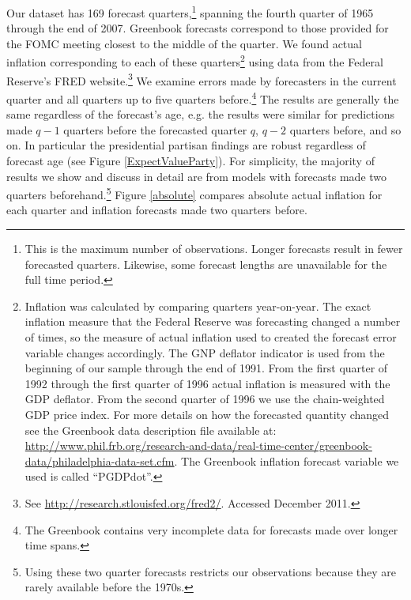 \documentclass[a4paper]{article}\usepackage[]{graphicx}\usepackage[]{color}
\begin{document}
Our dataset has 169 forecast quarters,\footnote{This is the maximum number of observations. Longer forecasts result in fewer forecasted quarters. Likewise, some forecast lengths are unavailable for the full time period.} spanning the fourth quarter of 1965 through the end of 2007. Greenbook forecasts correspond to those provided for the FOMC meeting closest to the middle of the quarter. We found actual inflation corresponding to each of these quarters\footnote{Inflation was calculated by comparing quarters year-on-year. The exact inflation measure that the Federal Reserve was forecasting changed a number of times, so the measure of actual inflation used to created the forecast error variable changes accordingly. The GNP deflator indicator is used from the beginning of our sample through the end of 1991. From the first quarter of 1992 through the first quarter of 1996 actual inflation is measured with the GDP deflator. From the second quarter of 1996 we use the chain-weighted GDP price index. For more details on how the forecasted quantity changed see the Greenbook data description file available at: \url{http://www.phil.frb.org/research-and-data/real-time-center/greenbook-data/philadelphia-data-set.cfm}. The Greenbook inflation forecast variable we used is called ``PGDPdot''.} using data from the Federal Reserve's FRED website.\footnote{See \url{http://research.stlouisfed.org/fred2/}. Accessed December 2011.} We examine errors made by forecasters in the current quarter and all quarters up to five quarters before.\footnote{The Greenbook contains very incomplete data for forecasts made over longer time spans.} The results are generally the same regardless of the forecast's age, e.g. the results were similar for predictions made $q - 1$ quarters before the forecasted quarter $q$, $q - 2$ quarters before, and so on. In particular the presidential partisan findings are robust regardless of forecast age (see Figure \ref{ExpectValueParty}). For simplicity, the majority of results we show and discuss in detail are from models with forecasts made two quarters beforehand.\footnote{Using these two quarter forecasts restricts our observations because they are rarely available before the 1970s.} Figure \ref{absolute} compares absolute actual inflation for each quarter and inflation forecasts made two quarters before.
\end{document}
